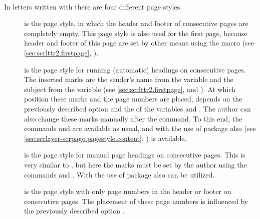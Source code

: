 \begin{Declaration}
  \\
\end{Declaration}%
%
%
%
%
%
%
In letters written with  there are four different
page styles.
\begin{description}
\item[] is the page style, in which the header and footer of
  consecutive pages are completely
  empty. This page style is also used for the first page, because
  header and footer of this page are set by other means using the
  macro  (see
  \autoref{sec:scrlttr2.firstpage}, ).
\item[] is the page style for running (automatic) headings
  on consecutive pages. The inserted marks are the sender's name from the
  variable  and the subject from
  the variable  (see
  \autoref{sec:scrlttr2.firstpage},
   and
  ).  At which position these
  marks and the page numbers are placed, depends on the previously described
  option  and the  of the variables
   and
  . The author can also change
  these marks manually after the  command. To this end, the
  commands  and  are available as usual, and
  with the use of package  also 
  (see \autoref{sec:scrlayer-scrpage.pagestyle.content},
  ) is available.
\item[] is the page style for manual page headings on
  consecutive pages. This is very similar to , but
  here the marks must be set by the author using the commands
   and
  .  With the use of package
   also  can be utilized.
\item[] is the page style with only page numbers in the
  header or footer on consecutive pages. The placement of these page numbers is
  influenced by the previously described option .
\end{description}

